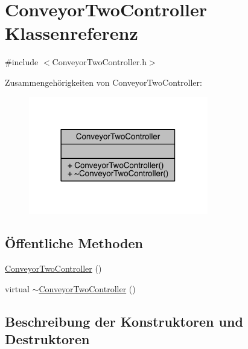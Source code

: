 \hypertarget{class_conveyor_two_controller}{}\section{Conveyor\+Two\+Controller Klassenreferenz}
\label{class_conveyor_two_controller}


{\ttfamily \#include $<$Conveyor\+Two\+Controller.\+h$>$}



Zusammengehörigkeiten von Conveyor\+Two\+Controller\+:\nopagebreak
\begin{figure}[H]
\begin{center}
\leavevmode
\includegraphics[width=222pt]{class_conveyor_two_controller__coll__graph}
\end{center}
\end{figure}
\subsection*{Öffentliche Methoden}
\begin{DoxyCompactItemize}
\item 
\hyperlink{class_conveyor_two_controller_abf1818572c62c90a086af7b92116d91c}{Conveyor\+Two\+Controller} ()
\item 
virtual \hyperlink{class_conveyor_two_controller_a7b2d996e62a8467455279ce295b5c889}{$\sim$\+Conveyor\+Two\+Controller} ()
\end{DoxyCompactItemize}


\subsection{Beschreibung der Konstruktoren und Destruktoren}
\hypertarget{class_conveyor_two_controller_abf1818572c62c90a086af7b92116d91c}{}\label{class_conveyor_two_controller_abf1818572c62c90a086af7b92116d91c} 
